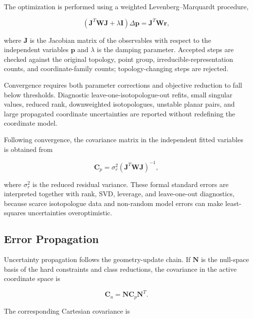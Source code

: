 \documentclass[aip,jcp,reprint,longbibliography,floatfix]{revtex4-2}
\begin{document}
The optimization is performed using a weighted Levenberg--Marquardt procedure,

\begin{equation}
\left(
\mathbf{J}^{T}
\mathbf{W}
\mathbf{J}
+
\lambda \mathbf{I}
\right)
\Delta \mathbf{p}
=
\mathbf{J}^{T}
\mathbf{W}
\mathbf{r},
\label{eq:lm-step}
\end{equation}

where $\mathbf{J}$ is the Jacobian matrix of the observables with respect to
the independent variables $\mathbf{p}$ and $\lambda$ is the damping parameter.
Accepted steps are checked against the original topology, point group,
irreducible-representation counts, and coordinate-family counts; topology-changing
steps are rejected.

Convergence requires both parameter corrections and objective reduction to fall
below thresholds. Diagnostic leave-one-isotopologue-out refits, small singular
values, reduced rank, downweighted isotopologues, unstable planar pairs, and
large propagated coordinate uncertainties are reported without redefining the
coordinate model.

Following convergence, the covariance matrix in the independent fitted
variables is obtained from

\begin{equation}
\mathbf{C}_{p}
=
\sigma_r^2
\left(
\mathbf{J}^{T}
\mathbf{W}
\mathbf{J}
\right)^{-1},
\end{equation}

where $\sigma_r^2$ is the reduced residual variance. These formal standard
errors are interpreted together with rank, SVD, leverage, and leave-one-out
diagnostics, because scarce isotopologue data and non-random model errors can
make least-squares uncertainties overoptimistic.\cite{Demaison2007EquilibriumReview}

\subsection{Error Propagation}

Uncertainty propagation follows the geometry-update chain. If $\mathbf{N}$ is
the null-space basis of the hard
constraints and class reductions, the covariance in the active coordinate
space is

\begin{equation}
\mathbf{C}_{a}
=
\mathbf{N}
\mathbf{C}_{p}
\mathbf{N}^{T}.
\end{equation}

The corresponding Cartesian covariance is
\end{document}
